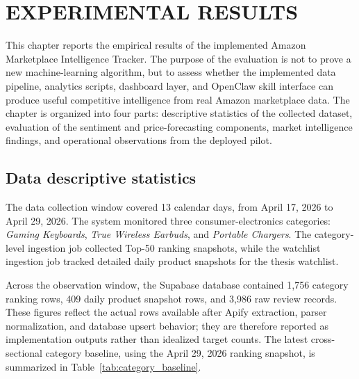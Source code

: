 \chapter{EXPERIMENTAL RESULTS}
\label{chap:results}

This chapter reports the empirical results of the implemented Amazon Marketplace Intelligence Tracker. The purpose of the evaluation is not to prove a new machine-learning algorithm, but to assess whether the implemented data pipeline, analytics scripts, dashboard layer, and OpenClaw skill interface can produce useful competitive intelligence from real Amazon marketplace data. The chapter is organized into four parts: descriptive statistics of the collected dataset, evaluation of the sentiment and price-forecasting components, market intelligence findings, and operational observations from the deployed pilot.

\section{Data descriptive statistics}

The data collection window covered 13 calendar days, from April 17, 2026 to April 29, 2026. The system monitored three consumer-electronics categories: \textit{Gaming Keyboards}, \textit{True Wireless Earbuds}, and \textit{Portable Chargers}. The category-level ingestion job collected Top-50 ranking snapshots, while the watchlist ingestion job tracked detailed daily product snapshots for the thesis watchlist.

Across the observation window, the Supabase database contained 1,756 category ranking rows, 409 daily product snapshot rows, and 3,986 raw review records. These figures reflect the actual rows available after Apify extraction, parser normalization, and database upsert behavior; they are therefore reported as implementation outputs rather than idealized target counts. The latest cross-sectional category baseline, using the April 29, 2026 ranking snapshot, is summarized in Table~\ref{tab:category_baseline}.

